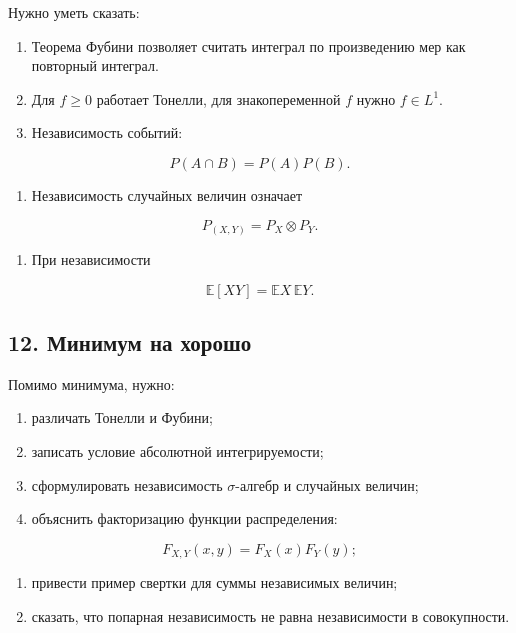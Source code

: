 \documentclass[
  11pt,
  a4paper,
]{article}
\providecommand{\tightlist}{%
  \setlength{\itemsep}{0pt}\setlength{\parskip}{0pt}}
\begin{document}
Нужно уметь сказать:

\begin{enumerate}
\def\labelenumi{\arabic{enumi}.}
\tightlist
\item
  Теорема Фубини позволяет считать интеграл по произведению мер как
  повторный интеграл.
\item
  Для \(f\ge0\) работает Тонелли, для знакопеременной \(f\) нужно
  \(f\in L^1\).
\item
  Независимость событий:
\end{enumerate}

\[
P(A\cap B)=P(A)P(B).
\]

\begin{enumerate}
\def\labelenumi{\arabic{enumi}.}
\setcounter{enumi}{3}
\tightlist
\item
  Независимость случайных величин означает
\end{enumerate}

\[
P_{(X,Y)}=P_X\otimes P_Y.
\]

\begin{enumerate}
\def\labelenumi{\arabic{enumi}.}
\setcounter{enumi}{4}
\tightlist
\item
  При независимости
\end{enumerate}

\[
\mathbb E[XY]=\mathbb EX\,\mathbb EY.
\]

\subsection{12. Минимум на
хорошо}\label{ux43cux438ux43dux438ux43cux443ux43c-ux43dux430-ux445ux43eux440ux43eux448ux43e}

Помимо минимума, нужно:

\begin{enumerate}
\def\labelenumi{\arabic{enumi}.}
\tightlist
\item
  различать Тонелли и Фубини;
\item
  записать условие абсолютной интегрируемости;
\item
  сформулировать независимость \(\sigma\)-алгебр и случайных величин;
\item
  объяснить факторизацию функции распределения:
\end{enumerate}

\[
F_{X,Y}(x,y)=F_X(x)F_Y(y);
\]

\begin{enumerate}
\def\labelenumi{\arabic{enumi}.}
\setcounter{enumi}{4}
\tightlist
\item
  привести пример свертки для суммы независимых величин;
\item
  сказать, что попарная независимость не равна независимости в
  совокупности.
\end{enumerate}
\end{document}
